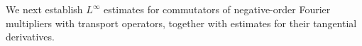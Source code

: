 \documentclass[reqno,11pt,a4paper]{amsart}
\begin{document}

We next establish $L^\infty$ estimates for commutators
of negative-order Fourier multipliers with transport operators,
together with estimates for their tangential derivatives.
\end{document}
